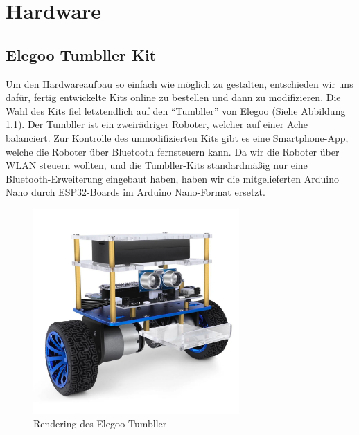 \chapter{Hardware}
\label{sec:hardware}
\section{Elegoo Tumbller Kit}
\label{subsec:elegoo_tumbller}
Um den Hardwareaufbau so einfach wie möglich zu gestalten,
entschieden wir uns dafür,
fertig entwickelte Kits online zu bestellen und dann zu modifizieren.
%
Die Wahl des Kits fiel letztendlich auf den ``Tumbller'' von Elegoo (Siehe Abbildung \ref{fig:elegoo_tumbller}).
%
Der Tumbller ist ein zweirädriger Roboter, welcher auf einer Ache balanciert.
%
Zur Kontrolle des unmodifizierten Kits gibt es eine Smartphone-App,
welche die Roboter über Bluetooth fernsteuern kann.
%
Da wir die Roboter über WLAN steuern wollten, 
und die Tumbller-Kits standardmäßig nur eine Bluetooth-Erweiterung eingebaut haben,
haben wir die mitgelieferten Arduino Nano durch ESP32-Boards im Arduino Nano-Format ersetzt.
\begin{figure}[H]
    \includegraphics[width=0.7\textwidth, center]{img/elegoo_tumbller.png}
    \caption{Rendering des Elegoo Tumbller}
    \label{fig:elegoo_tumbller}
\end{figure}

